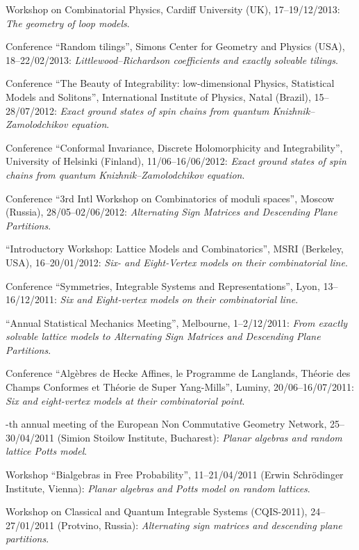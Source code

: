 \s Workshop on Combinatorial Physics, Cardiff University (UK), 17--19/12/2013: {\sl The geometry of loop models}.

\s Conference ``Random tilings'', Simons Center for Geometry and Physics (USA), 18--22/02/2013: {\sl Littlewood--Richardson coefficients and exactly solvable tilings}.

\s Conference ``The Beauty of Integrability: low-dimensional Physics, Statistical Models and Solitons'', International Institute of Physics, Natal (Brazil), 15--28/07/2012: {\sl Exact ground states of spin chains from quantum Knizhnik--Zamolodchikov equation}.

\s Conference ``Conformal Invariance, Discrete
Holomorphicity and Integrability'', University of Helsinki (Finland), 11/06--16/06/2012: {\sl Exact ground states of spin chains from quantum Knizhnik--Zamolodchikov equation}.

\s Conference ``3rd Intl Workshop on Combinatorics of moduli spaces'', Moscow (Russia), 28/05--02/06/2012: {\sl Alternating Sign Matrices and Descending Plane Partitions}.

\s ``Introductory Workshop: Lattice Models and Combinatorics'', MSRI (Berkeley, USA), 16--20/01/2012: {\sl Six- and Eight-Vertex models on their combinatorial line}.

\s Conference ``Symmetries, Integrable Systems and Representations'',
Lyon, 13--16/12/2011:
{\sl Six and Eight-vertex models on their combinatorial line}.

\s ``Annual Statistical Mechanics Meeting'', Melbourne, 1--2/12/2011: {\sl From exactly solvable lattice models to Alternating Sign Matrices and Descending Plane Partitions}.

\s Conference ``Alg\`ebres de Hecke Affines, le Programme de Langlands, Th\'eorie des Champs Conformes et Th\'eorie de Super Yang-Mills'', Luminy, 20/06--16/07/2011: {\sl Six and eight-vertex models at their combinatorial point}.

-th annual meeting of the European Non Commutative Geometry Network,
25--30/04/2011 (Simion Stoilow Institute, Bucharest):
{\sl Planar algebras and random lattice Potts model}.

\s Workshop ``Bialgebras in Free Probability'', 
11--21/04/2011 (Erwin Schr\"odinger Institute, Vienna):
{\sl Planar algebras and Potts model on random lattices}.

\s Workshop on Classical and Quantum Integrable Systems (CQIS-2011),
24--27/01/2011 (Protvino, Russia):
{\sl Alternating sign matrices and descending plane partitions}.

